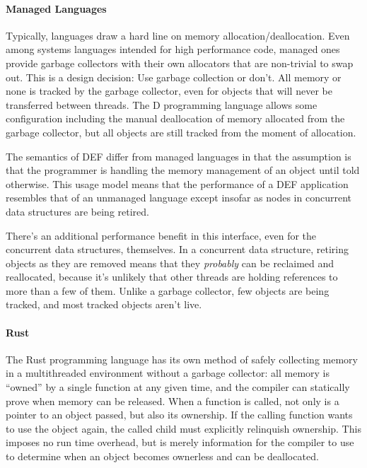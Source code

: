 \paragraph{Managed Languages} Typically, languages draw a hard line on memory allocation/deallocation.  Even among systems languages intended for high performance code, managed ones provide garbage collectors with their own allocators that are non-trivial to swap out.\cite{Go}\cite{DotNetGC}\cite{D}  This is a design decision: Use garbage collection or don't.  All memory or none is tracked by the garbage collector, even for objects that will never be transferred between threads.  The D programming language allows some configuration including the manual deallocation of memory allocated from the garbage collector, but all objects are still tracked from the moment of allocation.\cite{DPhobos}

The semantics of DEF differ from managed languages in that the assumption is that the programmer is handling the memory management of an object until told otherwise.  This usage model means that the performance of a DEF application resembles that of an unmanaged language except insofar as nodes in concurrent data structures are being retired.

There's an additional performance benefit in this interface, even for the concurrent data structures, themselves.  In a concurrent data structure, retiring objects as they are removed means that they \textit{probably} can be reclaimed and reallocated, because it's unlikely that other threads are holding references to more than a few of them.  Unlike a garbage collector, few objects are being tracked, and most tracked objects aren't live.

\paragraph{Rust} The Rust programming language has its own method of safely collecting memory in a multithreaded environment without a garbage collector: all memory is ``owned'' by a single function at any given time, and the compiler can statically prove when memory can be released.\cite{Rust}  When a function is called, not only is a pointer to an object passed, but also its ownership.  If the calling function wants to use the object again, the called child must explicitly relinquish ownership.  This imposes no run time overhead, but is merely information for the compiler to use to determine when an object becomes ownerless and can be deallocated.

